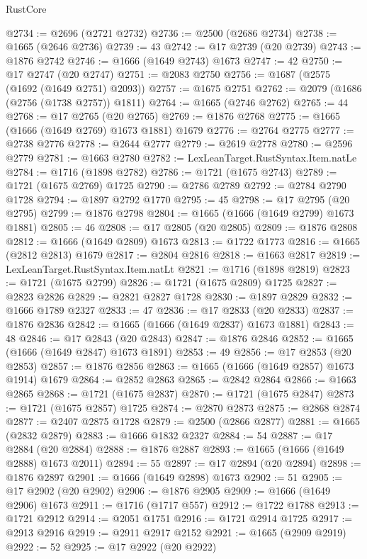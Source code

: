 \begin{lexlean}{RustCore}
\begin{coremodule}
@2734 := @2696 (@2721 @2732)
@2736 := @2500 (@2686 @2734)
@2738 := @1665 (@2646 @2736)
@2739 := 43
@2742 := @17 @2739 (@20 @2739)
@2743 := @1876 @2742
@2746 := @1666 (@1649 @2743) @1673
@2747 := 42
@2750 := @17 @2747 (@20 @2747)
@2751 := @2083 @2750
@2756 := @1687 (@2575 (@1692 (@1649 @2751) @2093))
@2757 := @1675 @2751
@2762 := @2079 (@1686 (@2756 (@1738 @2757)) @1811)
@2764 := @1665 (@2746 @2762)
@2765 := 44
@2768 := @17 @2765 (@20 @2765)
@2769 := @1876 @2768
@2775 := @1665 (@1666 (@1649 @2769) @1673 @1881) @1679
@2776 := @2764 @2775
@2777 := @2738 @2776
@2778 := @2644 @2777
@2779 := @2619 @2778
@2780 := @2596 @2779
@2781 := @1663 @2780
@2782 := LexLeanTarget.RustSyntax.Item.natLe
@2784 := @1716 (@1898 @2782)
@2786 := @1721 (@1675 @2743)
@2789 := @1721 (@1675 @2769) @1725
@2790 := @2786 @2789
@2792 := @2784 @2790 @1728
@2794 := @1897 @2792 @1770
@2795 := 45
@2798 := @17 @2795 (@20 @2795)
@2799 := @1876 @2798
@2804 := @1665 (@1666 (@1649 @2799) @1673 @1881)
@2805 := 46
@2808 := @17 @2805 (@20 @2805)
@2809 := @1876 @2808
@2812 := @1666 (@1649 @2809) @1673
@2813 := @1722 @1773
@2816 := @1665 (@2812 @2813) @1679
@2817 := @2804 @2816
@2818 := @1663 @2817
@2819 := LexLeanTarget.RustSyntax.Item.natLt
@2821 := @1716 (@1898 @2819)
@2823 := @1721 (@1675 @2799)
@2826 := @1721 (@1675 @2809) @1725
@2827 := @2823 @2826
@2829 := @2821 @2827 @1728
@2830 := @1897 @2829
@2832 := @1666 @1789 @2327
@2833 := 47
@2836 := @17 @2833 (@20 @2833)
@2837 := @1876 @2836
@2842 := @1665 (@1666 (@1649 @2837) @1673 @1881)
@2843 := 48
@2846 := @17 @2843 (@20 @2843)
@2847 := @1876 @2846
@2852 := @1665 (@1666 (@1649 @2847) @1673 @1891)
@2853 := 49
@2856 := @17 @2853 (@20 @2853)
@2857 := @1876 @2856
@2863 := @1665 (@1666 (@1649 @2857) @1673 @1914) @1679
@2864 := @2852 @2863
@2865 := @2842 @2864
@2866 := @1663 @2865
@2868 := @1721 (@1675 @2837)
@2870 := @1721 (@1675 @2847)
@2873 := @1721 (@1675 @2857) @1725
@2874 := @2870 @2873
@2875 := @2868 @2874
@2877 := @2407 @2875 @1728
@2879 := @2500 (@2866 @2877)
@2881 := @1665 (@2832 @2879)
@2883 := @1666 @1832 @2327
@2884 := 54
@2887 := @17 @2884 (@20 @2884)
@2888 := @1876 @2887
@2893 := @1665 (@1666 (@1649 @2888) @1673 @2011)
@2894 := 55
@2897 := @17 @2894 (@20 @2894)
@2898 := @1876 @2897
@2901 := @1666 (@1649 @2898) @1673
@2902 := 51
@2905 := @17 @2902 (@20 @2902)
@2906 := @1876 @2905
@2909 := @1666 (@1649 @2906) @1673
@2911 := @1716 (@1717 @557)
@2912 := @1722 @1788
@2913 := @1721 @2912
@2914 := @2051 @1751
@2916 := @1721 @2914 @1725
@2917 := @2913 @2916
@2919 := @2911 @2917 @2152
@2921 := @1665 (@2909 @2919)
@2922 := 52
@2925 := @17 @2922 (@20 @2922)

\end{coremodule}
\end{lexlean}
